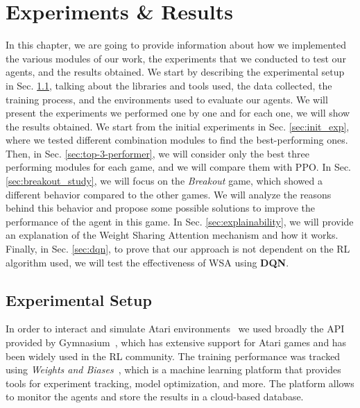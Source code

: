 
\chapter{Experiments \& Results}
\label{ch:experiments_and_results}
In this chapter, we are going to provide information about how we implemented the various modules of our work, the experiments that we conducted to test our agents, and the results obtained.
We start by describing the experimental setup in Sec. \ref{sec:exp_setup}, talking about the libraries and tools used, the data collected, the training process, and the environments used to evaluate our agents.
We will present the experiments we performed one by one and for each one, we will show the results obtained.
We start from the initial experiments in Sec. \ref{sec:init_exp}, where we tested different combination modules to find the best-performing ones.
Then, in Sec. \ref{sec:top-3-performer}, we will consider only the best three performing modules for each game, and we will compare them with PPO\@.
In Sec. \ref{sec:breakout_study}, we will focus on the \textit{Breakout} game, which showed a different behavior compared to the other games.
We will analyze the reasons behind this behavior and propose some possible solutions to improve the performance of the agent in this game.
In Sec. \ref{sec:explainability}, we will provide an explanation of the Weight Sharing Attention mechanism and how it works.
Finally, in Sec. \ref{sec:dqn}, to prove that our approach is not dependent on the RL algorithm used, we will test the effectiveness of WSA  using \textbf{DQN}.

\section{Experimental Setup}\label{sec:exp_setup}
In order to interact and simulate Atari environments~\citep{bellemare2013atari} we used broadly the API provided by Gymnasium~\citep{towers_gymnasium_2023}, which has extensive support for Atari games and has been widely used in the RL community.
The training performance was tracked using \textit{Weights and Biases}~\citep{wandb}, which is a machine learning platform that provides tools for experiment tracking, model optimization, and more.
The platform allows to monitor the agents and store the results in a cloud-based database.

